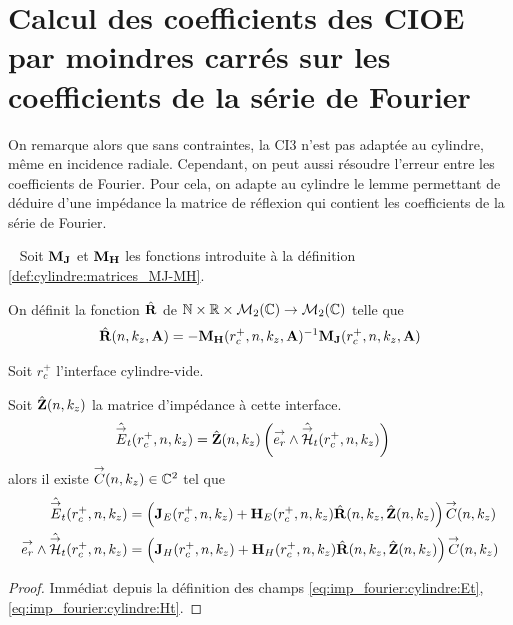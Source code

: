 \section{Calcul des coefficients des CIOE par moindres carrés sur les coefficients de la série de Fourier}

  On remarque alors que sans contraintes, la CI3 n'est pas adaptée au cylindre, même en incidence radiale. Cependant, on peut aussi résoudre l'erreur entre les coefficients de Fourier. Pour cela, on adapte au cylindre le lemme permettant de déduire d'une impédance la matrice de réflexion qui contient les coefficients de la série de Fourier.

  \begin{defn}\label{def:cylindre:reflexion_from_impedance}{}~
    Soit \(\mathbf{M}_{\mathbf{J}}\) et \(\mathbf{M}_{\mathbf{H}}\) les fonctions introduite à la définition \ref{def:cylindre:matrices_MJ-MH}.

    On définit la fonction \(\hat{\mathbf{R}}\) de \(\mathbb N\times\mathbb R\times\mathcal{M}_2(\mathbb C) \rightarrow \mathcal{M}_2(\mathbb C)\) telle que
    \begin{multline*}
      \hat{\mathbf{R}}(n,k_z,\mathbf{A}) = - \mathbf{M}_{\mathbf{H}}(r_c^+,n,k_z,\mathbf{A})^{-1}\mathbf{M}_{\mathbf{J}}(r_c^+,n,k_z,\mathbf{A})
    \end{multline*}
  \end{defn}
    \begin{prop}
      Soit \(r_c^+\) l'interface cylindre-vide.

      Soit \(\hat{\mathbf{Z}}(n,k_z)\) la matrice d'impédance à cette interface.
      \begin{align*}
        \hat{{\overset{\rightarrow}{E}}}_t(r_c^+,n,k_z) &= \hat{\mathbf{Z}}(n,k_z) \left({\overset{\rightarrow}{e_r}} \wedge \hat{{\overset{\rightarrow}{\mathcal{H}}}}_t(r_c^+,n,k_z)\right)
      \end{align*}
      alors il existe \({\overset{\rightarrow}{C}}(n,k_z) \in \mathbb C^2\) tel que 
      \begin{align*}
        \hat{{\overset{\rightarrow}{E}}}_t(r_c^+,n,k_z) &= \left(\mathbf{J}_E(r_c^+,n,k_z) + \mathbf{H}_E(r_c^+,n,k_z)\hat{\mathbf{R}}(n,k_z,\hat{\mathbf{Z}}(n,k_z)\right){\overset{\rightarrow}{C}}(n,k_z)
        \\
        {\overset{\rightarrow}{e_r}} \wedge \hat{{\overset{\rightarrow}{\mathcal{H}}}}_t(r_c^+,n,k_z) &= \left(\mathbf{J}_H(r_c^+,n,k_z) + \mathbf{H}_H(r_c^+,n,k_z)\hat{\mathbf{R}}(n,k_z,\hat{\mathbf{Z}}(n,k_z)\right){\overset{\rightarrow}{C}}(n,k_z)
      \end{align*}
    \end{prop}
    \begin{proof}
      Immédiat depuis la définition des champs \eqref{eq:imp_fourier:cylindre:Et},\eqref{eq:imp_fourier:cylindre:Ht}.
    \end{proof}


